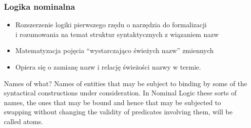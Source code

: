 \documentclass[aspectratio=169]{beamer}
\begin{document}
\begin{frame}
\frametitle{Logika nominalna}
  \begin{itemize}
  \item Rozszerzenie logiki pierwszego rzędu o narzędzia do formalizacji \\
i rozumowania na temat struktur syntaktycznych z wiązaniem nazw \\
  \item Matematyzacja pojęcia
``wystarczająco świeżych nazw'' zmiennych \\
  \item
  Opiera się o zamianę nazw i relację świeżości nazwy w termie.\\
  \end{itemize}
\begin{mdframed}[frametitle={\textnormal{\scriptsize \textbf{Andrew M. Pitts}, \textit{``Nominal logic, a first order theory of names and binding''}}:}]
{\footnotesize
Names of what? Names of entities that may be subject to binding by some of
the syntactical constructions under consideration. In Nominal Logic these sorts of
names, the ones that may be bound and hence that may be subjected to swapping
without changing the validity of predicates involving them, will be called atoms.
}
\end{mdframed}
\end{frame}
\end{document}
